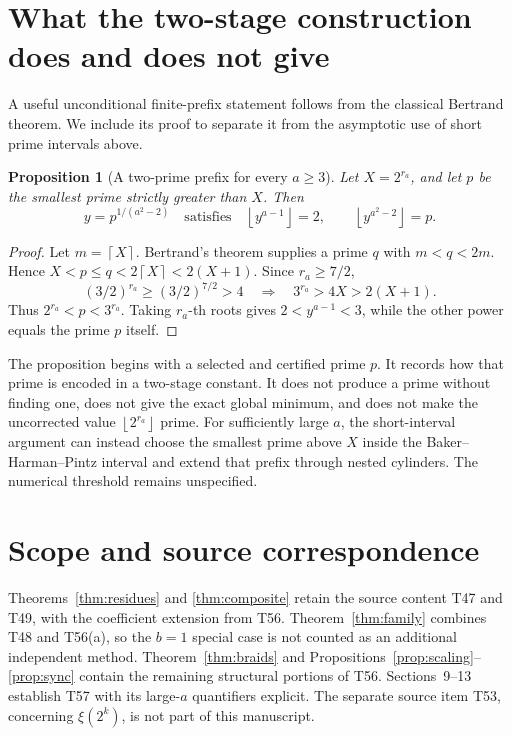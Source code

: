 \documentclass[11pt,a4paper]{article}
\newtheorem{proposition}[theorem]{Proposition}
\theoremstyle{definition}\newtheorem{definition}[theorem]{Definition}
\theoremstyle{remark}\newtheorem{remark}[theorem]{Remark}
\newcommand{\floor}[1]{\left\lfloor #1\right\rfloor}\newcommand{\ceil}[1]{\left\lceil #1\right\rceil}
\begin{document}
\section{What the two-stage construction does and does not give}
A useful unconditional finite-prefix statement follows from the
classical Bertrand theorem. We include its proof to separate it from
the asymptotic use of short prime intervals above.

\begin{proposition}[A two-prime prefix for every $a\ge3$]
\label{prop:two}
Let $X=2^{r_a}$, and let $p$ be the smallest prime strictly greater
than $X$. Then
\[
 y=p^{1/(a^2-2)}
 \quad\text{satisfies}\quad
 \floor{y^{a-1}}=2,\qquad\floor{y^{a^2-2}}=p.
\]
\end{proposition}
\begin{proof}
Let $m=\ceil X$. Bertrand's theorem supplies a prime $q$ with
$m<q<2m$. Hence $X<p\le q<2\ceil X<2(X+1)$.
Since $r_a\ge7/2$,
\[
 (3/2)^{r_a}\ge(3/2)^{7/2}>4
 \quad\Longrightarrow\quad3^{r_a}>4X>2(X+1).
\]
Thus $2^{r_a}<p<3^{r_a}$. Taking $r_a$-th roots gives
$2<y^{a-1}<3$, while the other power equals the prime $p$ itself.
\end{proof}

The proposition begins with a selected and certified prime $p$.
It records how that prime is encoded in a two-stage constant.
It does not produce a prime without finding one, does not give the
exact global minimum, and does not make the uncorrected value
$\floor{2^{r_a}}$ prime. For sufficiently large $a$, the short-interval
argument can instead choose the smallest prime above $X$ inside the
Baker--Harman--Pintz interval and extend that prefix through nested
cylinders. The numerical threshold remains unspecified.

\section{Scope and source correspondence}
Theorems~\ref{thm:residues} and \ref{thm:composite} retain the
source content T47 and T49, with the coefficient extension from T56.
Theorem~\ref{thm:family} combines T48 and T56(a), so the
$b=1$ special case is not counted as an additional independent
method. Theorem~\ref{thm:braids} and
Propositions~\ref{prop:scaling}--\ref{prop:sync} contain the remaining
structural portions of T56. Sections~9--13 establish T57 with its
large-$a$ quantifiers explicit. The separate source item T53,
concerning $\xi(2^k)$, is not part of this manuscript.
\end{document}
